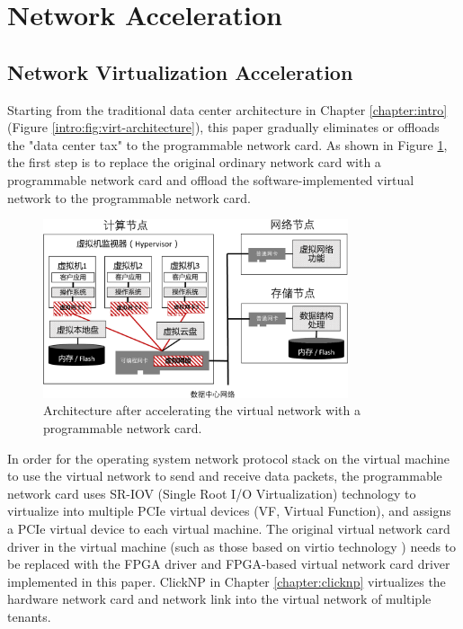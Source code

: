 \section{Network Acceleration}

\subsection{Network Virtualization Acceleration}

Starting from the traditional data center architecture in Chapter \ref{chapter:intro} (Figure \ref{intro:fig:virt-architecture}), this paper gradually eliminates or offloads the "data center tax" to the programmable network card. As shown in Figure \ref{arch:fig:virtual-network}, the first step is to replace the original ordinary network card with a programmable network card and offload the software-implemented virtual network to the programmable network card.

\begin{figure}[htbp]
	\centering
	\includegraphics[width=0.8\textwidth]{figures/virtual_network.pdf}
	\caption{Architecture after accelerating the virtual network with a programmable network card.}
	\label{arch:fig:virtual-network}
\end{figure}

In order for the operating system network protocol stack on the virtual machine to use the virtual network to send and receive data packets, the programmable network card uses SR-IOV (Single Root I/O Virtualization) technology \cite{dong2012high} to virtualize into multiple PCIe virtual devices (VF, Virtual Function), and assigns a PCIe virtual device to each virtual machine. The original virtual network card driver in the virtual machine (such as those based on virtio technology \cite{russell2008virtio}) needs to be replaced with the FPGA driver and FPGA-based virtual network card driver implemented in this paper. ClickNP in Chapter \ref{chapter:clicknp} virtualizes the hardware network card and network link into the virtual network of multiple tenants.

